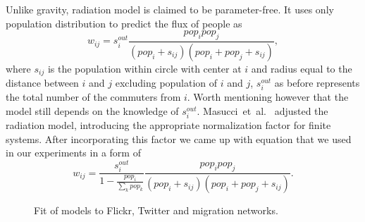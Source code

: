 \documentclass[aps,superscriptaddress,showkeys,nofootinbib]{revtex4-1}
\begin{document}
Unlike gravity, radiation model is claimed to be parameter-free. It uses only population distribution to predict the flux of people as 
$$
w_{ij}=s_i^{out}\frac{pop_i pop_j}{(pop_i + s_{ij})(pop_i + pop_j + s_{ij})},
$$
where $s_{ij}$ is the population within circle with center at $i$ and radius equal to the distance between $i$ and $j$ excluding population of $i$ and $j$, $s_i^{out}$ as before represents the total number of the commuters from $i$. Worth mentioning however that the model still depends on the knowledge of $s_i^{out}$. Masucci~et~al.~\cite{masucci2013gravity} adjusted the radiation model, introducing the appropriate normalization factor for finite systems. After incorporating this factor we came up with equation that we used in our experiments in a form of 
$$
w_{ij}=\frac{s_i^{out}}{1 - \frac{pop_i}{\sum_{k}{pop_k}}}\frac{pop_i pop_j}{(pop_i + s_{ij})(pop_i + pop_j + s_{ij})}.
$$

\begin{figure}[t]
\centering
{}
\caption{\label{fig::models_fit}Fit of models to Flickr, Twitter and migration networks.}
\end{figure}
\end{document}
